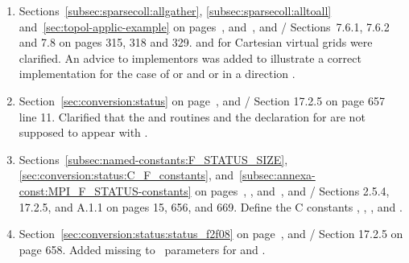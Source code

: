 \begin{enumerate}

\item
{}
Sections~\ref{subsec:sparsecoll:allgather}, \ref{subsec:sparsecoll:alltoall} and~\ref{sec:topol-applic-example}
on pages~\pageref{subsec:sparsecoll:allgather}, \pageref{subsec:sparsecoll:alltoall} and~\pageref{sec:topol-applic-example},
and \MPIIIIDOTI/ Sections~7.6.1, 7.6.2 and 7.8 on pages 315, 318 and 329.
\newline
{}%
%
%
and
%
%
for Cartesian virtual grids were clarified. 
An advice to implementors was added to illustrate a correct implementation
for the case of  or  
and  or  in a direction .

\item
  Section~\ref{sec:conversion:status} on
  page~\pageref{sec:conversion:status-f2f08-not-in-mpifh}, and
  \MPIIIIDOTI/ Section 17.2.5 on page 657 line 11.
  \newline
  Clarified that the  and
   routines and the declaration for
   are not supposed to appear with
  .


\item
  Sections~\ref{subsec:named-constants:F_STATUS_SIZE}, \ref{sec:conversion:status:C_F_constants},
  and~\ref{subsec:annexa-const:MPI_F_STATUS-constants} on
  pages~\pageref{subsec:named-constants:F_STATUS_SIZE},
  \pageref{sec:conversion:status:C_F_constants},
  and~\pageref{subsec:annexa-const:MPI_F_STATUS-constants}, and
  \MPIIIIDOTI/ Sections 2.5.4, 17.2.5, and A.1.1 on pages 15, 656, and
  669.
  \newline
  Define the C constants , ,
  , and .

\item
  Section~\ref{sec:conversion:status:status_f2f08} on
  page~\pageref{sec:conversion:status:status_f2f08}, and
  \MPIIIIDOTI/ Section 17.2.5 on page 658.
  \newline
  Added missing  to \IN\ parameters for
   and .

\end{enumerate}

